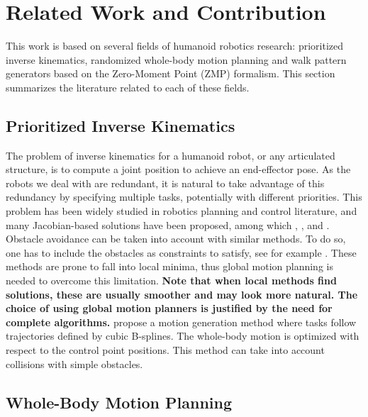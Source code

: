 \documentclass{article}
\begin{document}
\section{Related Work and Contribution}
\label{sec:related}


This work is based on several fields of humanoid robotics
research: prioritized inverse kinematics, randomized  whole-body  motion
planning and walk pattern generators based on the Zero-Moment
Point (ZMP) formalism. This section summarizes the literature related to each of 
these fields.

\subsection{Prioritized Inverse Kinematics}

The problem of inverse kinematics for a humanoid robot, or any articulated
structure, is to compute a joint position to achieve an end-effector pose. As the
robots we deal with are redundant, it is natural to take advantage of
this redundancy by specifying multiple tasks, potentially with
different priorities. This problem has been widely studied in robotics
planning and control literature, and many Jacobian-based solutions have been
proposed, among which 
\cite{nakamura1986iks}, \cite{siciliano1991gfm},
\cite{baerlocher1998tpf} and \cite{khatib2004wbd}.
Obstacle avoidance can be taken into account with similar methods. To
do so, one has to include the obstacles as  constraints to
satisfy, see for example \cite{kanehiro2008lca}.
These methods are prone to fall into local minima, thus global motion
planning is needed to overcome this limitation. 
{\bf Note that when local methods find solutions, these are usually smoother
and may look more natural. The choice of using global motion planners
is justified by the need for complete algorithms.}
\cite{TouGieGoe2007} propose a motion generation method where tasks follow
trajectories defined by cubic B-splines. The whole-body motion is optimized
with respect to the control point positions. This method can take into account
collisions with simple obstacles.

\subsection{Whole-Body Motion Planning}
\end{document}
